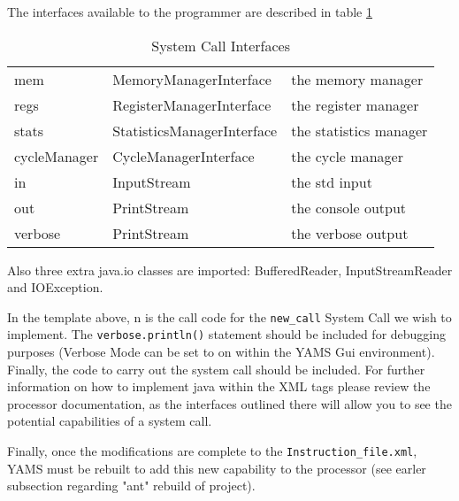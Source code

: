 The interfaces available to the programmer are described in table \ref{tab:SyscallInterfaces}

\begin{table}
\begin{center}
	\begin{tabular}{|l|l|l|}
	\hline
	mem			&	MemoryManagerInterface		&	the memory manager \\
	regs		&	RegisterManagerInterface	&	the register manager \\
	stats		&	StatisticsManagerInterface	&	the statistics manager \\
	cycleManager&	CycleManagerInterface		&	the cycle manager \\
	in			&	InputStream					&	the std input \\
	out			&	PrintStream					&	the console output \\
	verbose		&	PrintStream					&	the verbose output \\
	\hline
	\end{tabular}
\caption{System Call Interfaces}
\label{tab:SyscallInterfaces}
\end{center}
\end{table}

Also three extra java.io classes are imported: BufferedReader, InputStreamReader and IOException.


In the template above, n is the call code for the \verb"new_call" System Call we wish to implement. The \verb"verbose.println()" statement should be included for debugging purposes (Verbose Mode can be set to on within the YAMS Gui environment). Finally, the code to carry out the system call should be included. For further information on how to implement java within the XML tags please review the processor documentation, as the interfaces outlined there will allow you to see the potential capabilities of a system call.
	
Finally, once the modifications are complete to the \verb"Instruction_file.xml", YAMS must be rebuilt to add this new capability to the processor (see earler subsection regarding "ant" rebuild of project).

